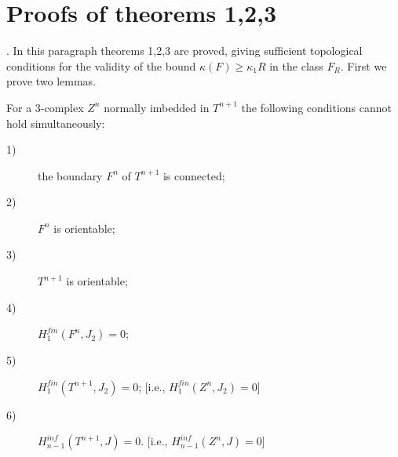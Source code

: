 \documentclass{amsart}
\theoremstyle{plain}
\theoremstyle{definition}
\begin{document}
\section{Proofs of theorems 1,2,3}\label{sec:proofs}

. In this paragraph theorems 1,2,3 are proved, giving sufficient
topological conditions for the validity of the bound $\kappa(F) \ge
\kappa_1R$ in the class $F_R$. First we prove two lemmas.
\begin{lem}\label{Lemma 19} For a 3-complex $Z^n$ normally imbedded
in $T^{n+1}$ the following conditions cannot hold simultaneously:
\begin{description}
\item[1)] the boundary $F^n$ of $T^{n+1}$ is connected;
\item[2)] $F^n$ is orientable;
\item[3)] $T^{n+1}$ is orientable;
\item[4)] $H^{fin}_1(F^n,J_2) = 0$;
\item[5)] $H^{fin}_1(T^{n+1},J_2) = 0$; [i.e., $H^{fin}_1(Z^n,J_2)
= 0$]
\item[6)] $H^{inf}_{n-1}(T^{n+1}, J) = 0$. [i.e.,
$H^{inf}_{n-1}(Z^n,J) =0$]
\end{description}
\end{lem}
\end{document}
